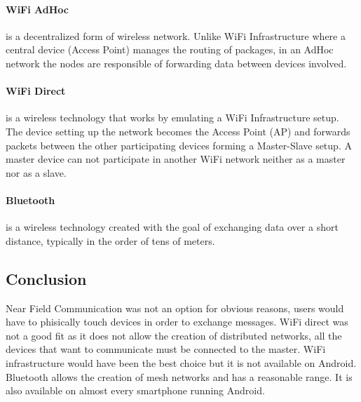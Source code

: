 \paragraph{WiFi AdHoc} 
is a decentralized form of wireless network. Unlike WiFi Infrastructure where a central device (Access Point) manages the routing of packages, in an AdHoc network the nodes are responsible of forwarding data between devices involved.

\paragraph{WiFi Direct}
is a wireless technology that works by emulating a WiFi Infrastructure setup. The device setting up the network becomes the Access Point (AP) and forwards packets between the other participating devices forming a Master-Slave setup.
A master device can not participate in another WiFi network neither as a master nor as a slave.

\paragraph{Bluetooth}
is a wireless technology created with the goal of exchanging data over a short distance, typically in the order of tens of meters.

\subsection{Conclusion}
Near Field Communication was not an option for obvious reasons, users would have to phisically touch devices in order to exchange messages.
WiFi direct was not a good fit as it does not allow the creation of distributed networks, all the devices that want to communicate must be connected to the master.
WiFi infrastructure would have been the best choice but it is not available on Android.
Bluetooth allows the creation of mesh networks and has a reasonable range. It is also available on almost every smartphone running Android.